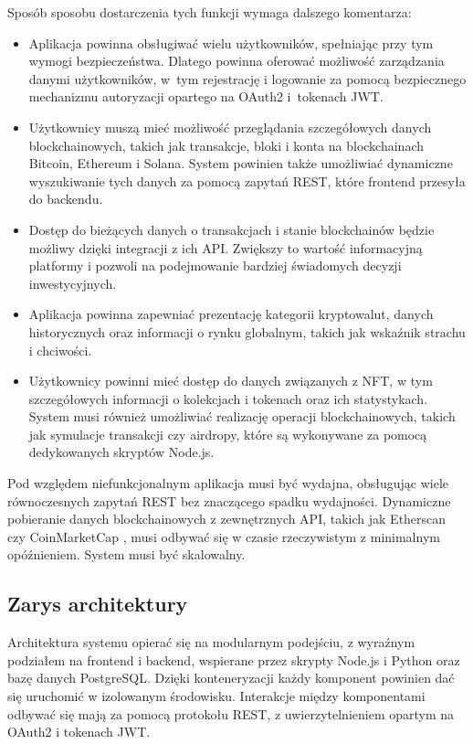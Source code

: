 Sposób sposobu dostarczenia tych funkcji wymaga dalszego komentarza:
\begin{itemize}
\item Aplikacja powinna obsługiwać wielu użytkowników, spełniając przy tym wymogi bezpieczeństwa. Dlatego powinna oferować możliwość zarządzania danymi użytkowników, w~tym rejestrację i logowanie za pomocą bezpiecznego mechanizmu autoryzacji opartego na OAuth2 i~tokenach JWT. 
\item Użytkownicy muszą mieć możliwość przeglądania szczegółowych danych blockchainowych, takich jak transakcje, bloki i konta na blockchainach Bitcoin, Ethereum i Solana. System powinien także umożliwiać dynamiczne wyszukiwanie tych danych za pomocą zapytań REST, które frontend przesyła do backendu.
\item Dostęp do bieżących danych o transakcjach i stanie blockchainów będzie możliwy dzięki integracji z ich API. Zwiększy to wartość informacyjną platformy i pozwoli na podejmowanie bardziej świadomych decyzji inwestycyjnych.
\item Aplikacja powinna zapewniać prezentację kategorii kryptowalut, danych historycznych oraz informacji o rynku globalnym, takich jak wskaźnik strachu i chciwości. 
\item Użytkownicy powinni mieć dostęp do danych związanych z NFT, w tym szczegółowych informacji o kolekcjach i tokenach oraz ich statystykach. System musi również umożliwiać realizację operacji blockchainowych, takich jak symulacje transakcji czy airdropy, które są wykonywane za pomocą dedykowanych skryptów Node.js.
\end{itemize}

Pod względem niefunkcjonalnym aplikacja musi być wydajna, obsługując wiele równoczesnych zapytań REST bez znaczącego spadku wydajności. Dynamiczne pobieranie danych blockchainowych z zewnętrznych API, takich jak Etherscan \cite{etherscan_api} czy CoinMarketCap \cite{coinmarketcap_api}, musi odbywać się w czasie rzeczywistym z minimalnym opóźnieniem. System musi być skalowalny.

\subsection{Zarys architektury}\label{subsec:ZarysArchitektury}
Architektura systemu opierać się na modularnym podejściu, z wyraźnym podziałem na frontend i backend, wspierane przez skrypty Node.js i Python oraz bazę danych PostgreSQL. Dzięki konteneryzacji każdy komponent powinien dać się uruchomić w izolowanym środowisku. Interakcje między komponentami odbywać się mają za pomocą protokołu REST, z uwierzytelnieniem opartym na OAuth2 i tokenach JWT.

